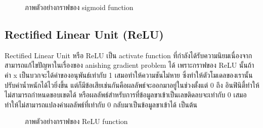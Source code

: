 \documentclass[12pt,oneside,openright,a4paper]{cpe-thai-project}
\begin{document}
\begin{figure}[!ht]\centering
  \setlength{\fboxrule}{0.2mm} %
  \setlength{\fboxsep}{1cm}
  \caption{ภาพตัวอย่างกราฟของ sigmoid function}\label{fig:sigmoid}
\end{figure}

\subsection{Rectified Linear Unit (ReLU)}
Rectified Linear Unit หรือ ReLU เป็น activate function ที่กำลังได้รับความนิยมเนื่องจากสามารถแก้ไขปัญหาในเรื่องของ 
anishing gradient problem ได้ เพราะกราฟของ ReLU นั้นถ้าค่า x เป็นบวกจะได้ค่าของอนุพันธ์เท่ากับ 1 เสมอทำให้ความชันไม่หาย 
ซึ่งทำให้ตัวโมเดลของเรานั้นปรับค่าน้ำหนักได้ไวยิ่งขึ้น แต่ก็มีข้อเสียเช่นกันคือผลลัพธ์จะออกมาอยู่ในช่วงตั้งแต่ 0 ถึง อินฟินิตี้ทำให้ไม่สามารถกำหนดขอบเขตได้ หรือผลลัพธ์สำหรับการที่ข้อมูลขาเข้าเป็นเลขติดลบจะเท่ากับ 
0 เสมอทำให้ไม่สามารถแปลงค่าผลลัพธ์ที่เท่ากับ 0 กลับมาเป็นข้อมูลขาเข้าได้ เป็นต้น 


\begin{figure}[!ht]\centering
  \setlength{\fboxrule}{0.2mm} %
  \setlength{\fboxsep}{1cm}
  \caption{ภาพตัวอย่างกราฟของ ReLU function}\label{fig:relu}
\end{figure}
\end{document}
